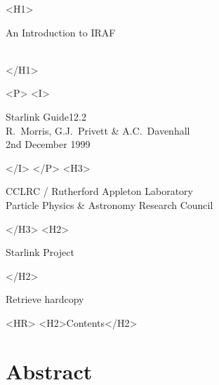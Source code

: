 \documentclass[twoside,11pt]{article}
\newcommand{\stardoccategory}  {Starlink Guide}
\newcommand{\stardocsource}    {sg\stardocnumber}
\newcommand{\stardocnumber}    {12.2}
\newcommand{\stardocauthors}   {R.~Morris, G.J.~Privett \& A.C.~Davenhall}
\newcommand{\stardocdate}      {2nd December 1999}
\newcommand{\stardoctitle}     {An Introduction to IRAF}
\newcommand{\htmladdnormallink}[2]{#1}
\newcommand{\htmladdimg}[1]{}
\newcommand{\htmlref}[2]{#1}
\newcommand{\htmladdtonavigation}[1]{}
\newcommand{\xlabel}[1]{}
\newcommand{\latexonlytoc}[0]{\tableofcontents}
\begin{document}
\begin{htmlonly}
   \xlabel{}
   \begin{rawhtml} <H1> \end{rawhtml}
      \stardoctitle\\
      \stardocversion\\
      \stardocmanual
   \begin{rawhtml} </H1> \end{rawhtml}


   \begin{rawhtml} <P> <I> \end{rawhtml}
   \stardoccategory \stardocnumber \\
   \stardocauthors \\
   \stardocdate
   \begin{rawhtml} </I> </P> <H3> \end{rawhtml}
      \htmladdnormallink{CCLRC}{http://www.cclrc.ac.uk} /
      \htmladdnormallink{Rutherford Appleton Laboratory}
                        {http://www.cclrc.ac.uk/ral} \\
      \htmladdnormallink{Particle Physics \& Astronomy Research Council}
                        {http://www.pparc.ac.uk} \\
   \begin{rawhtml} </H3> <H2> \end{rawhtml}
      \htmladdnormallink{Starlink Project}{http://star-www.rl.ac.uk/}
   \begin{rawhtml} </H2> \end{rawhtml}
   \htmladdnormallink{\htmladdimg{source.gif} Retrieve hardcopy}
      {http://star-www.rl.ac.uk/cgi-bin/hcserver?\stardocsource}\\

  \label{stardoccontents}
  \begin{rawhtml} 
    <HR>
    <H2>Contents</H2>
  \end{rawhtml}
  \renewcommand{\latexonlytoc}[0]{}
  \htmladdtonavigation{\htmlref{\htmladdimg{contents_motif.gif}}
        {stardoccontents}}

  \section{\xlabel{abstract}Abstract}
\end{htmlonly}
\end{document}
